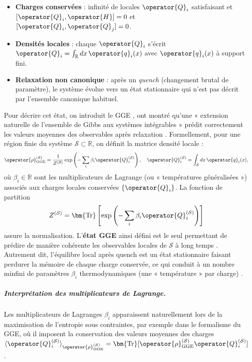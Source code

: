 \begin{itemize}[label = $\bullet$]
	\item {\bf Charges conservées} : infinité de locales $\operator{Q}_i$ satisfaisant et $[\operator{Q}_i , \operator{H} ] = 0$ et $[\operator{Q}_i , \operator{Q}_j ] = 0$.
	\item {\bf Densités locales} : chaque $\operator{Q}_i$ s’écrit $\operator{Q}_i = \int_\mathbb{R} dx \, \operator{q}_i(x)$ avec $\operator{q}_i(x)$ à support fini.
	\item {\bf Relaxation non canonique} : après un {\em quench} (changement brutal de paramètre), le système évolue vers un état stationnaire qui n’est pas décrit par l’ensemble canonique habituel.
\end{itemize}

\medskip

Pour décrire cet état, on introduit le \gls{GGE} \cite{rigol2007relaxation}, ont montré qu’une « extension naturelle de l’ensemble de Gibbs aux systèmes intégrables » prédit correctement les valeurs moyennes des observables après relaxation .  Formellement, pour une région finie du système $\mathcal{S} \subset \mathbb{R}$, on définit la matrice densité locale :
\begin{eqnarray}
	\operator{\rho}^{(\mathcal{S})}_{\mathrm{GGE}} = \frac{1}{Z^{(\mathcal{S})}}\exp \left ( - \sum_i \beta_i \operator{Q}_i^{(\mathcal{S})} \right), \quad \operator{Q}_i^{(\mathcal{S})} = \int_\mathcal{S} dx \, \operator{q}_i(x), \label{chap.TBA.op.rho.S}	
\end{eqnarray}
où $\beta_i \in \mathbb{R}$ sont les multiplicateurs de Lagrange (ou « températures généralisées ») associés aux charges locales conservées $\{\operator{Q}_i\}$. La fonction de partition 
\begin{eqnarray}
	Z^{(\mathcal{S})} = \bm{\mathrm{Tr}}\left [\exp \left( - \sum_i \beta_i \operator{Q}_i^{(\mathcal{S})} \right ) \right ]  \label{chap.TBA.op.Z.S}	
\end{eqnarray}
 assure la normalisation. L’{\bf état \gls{GGE}} ainsi défini est le seul permettant de prédire de manière cohérente les observables locales de $\mathcal{S}$ à long temps \cite{Nardis_2016}. Autrement dit, l’équilibre local après quench est un état stationnaire faisant perdurer la mémoire de chaque charge conservée, ce qui conduit à un nombre minfini de paramètres $\beta_i$ thermodynamiques (une « température » par charge) \cite{Nardis_2017}.
 
 \medskip

 \subparagraph{Interprétation des multiplicateurs de Lagrange.}
Les multiplicateurs de Lagranges $\beta_i$ apparaissent naturellement lors de la maximisation de l'entropie sous contraintes, par exemple dans le formalisme du \gls{GGE}, oû il imposent la conservation des valeurs moyennes des charges $\langle \operator{Q}_i^{(\mathcal{S})} \rangle_{\operator{\rho}^{(\mathcal{S})}_{\mathrm{GGE}}} = \bm{\mathrm{Tr}}[\operator{\rho}^{(\mathcal{S})}_{\mathrm{GGE}} \operator{Q}_i^{(\mathcal{S})}]   $.

